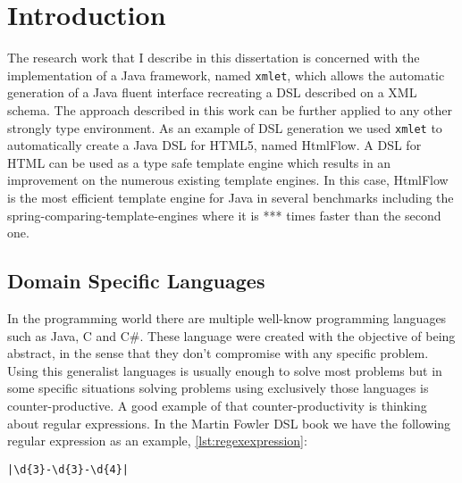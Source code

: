 \chapter{Introduction}
\label{cha:introduction}

The research work that I describe in this dissertation is concerned with the implementation of a Java framework, named \texttt{xmlet}, which allows the automatic generation of a Java fluent interface\cite{fluentinterface} recreating a \ac{DSL}\cite{dsl} described on a \ac{XML} schema. The approach described in this work can be further applied to any other strongly type environment. As an example of \ac{DSL} generation we used \texttt{xmlet} to automatically create a Java \ac{DSL} for \ac{HTML}5, named HtmlFlow. A \ac{DSL} for \ac{HTML} can be used as a type safe template engine which results in an improvement on the numerous existing template engines. In this case, HtmlFlow is the most efficient template engine for Java in several benchmarks including the spring-comparing-template-engines where it is *** times faster than the second one.


\section{Domain Specific Languages}


In the programming world there are multiple well-know programming languages such as Java, C and C\#. These language were created with the objective of being abstract, in the sense that they don't compromise with any specific problem. Using this generalist languages is usually enough to solve most problems but in some specific situations solving problems using exclusively those languages is counter-productive. A good example of that counter-productivity is thinking about regular expressions. In the Martin Fowler \ac{DSL} book\cite{dslbook} we have the following regular expression as an example, \ref{lst:regexexpression}:

\bigskip

\begin{minipage}{\linewidth}
\begin{lstlisting}[caption={Regular Expression Example}, label={lst:regexexpression}, style=dynamicviewsex]
|\d{3}-\d{3}-\d{4}|
\end{lstlisting}
\end{minipage} 

